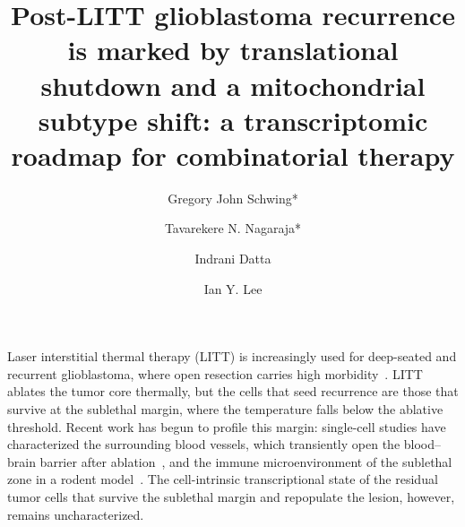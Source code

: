 \documentclass[unnumsec,webpdf,contemporary,large]{oup-authoring-template}
\begin{document}


\title[Post-LITT glioblastoma transcriptomic roadmap]{Post-LITT glioblastoma recurrence is marked by translational shutdown and a mitochondrial subtype shift: a transcriptomic roadmap for combinatorial therapy}

\author[1,$\ast$]{Gregory John Schwing*}
\author[2]{Tavarekere N. Nagaraja*}
\author[2]{Indrani Datta}
\author[2]{Ian Y. Lee}

\address[1]{, , }
\address[2]{, , }


\received{}{}{}
\revised{}{}{}
\accepted{}{}{}

\maketitle


\noindent Laser interstitial thermal therapy (LITT) is increasingly used for deep-seated and recurrent glioblastoma, where open resection carries high morbidity~\cite{LITT_review}. LITT ablates the tumor core thermally, but the cells that seed recurrence are those that survive at the sublethal margin, where the temperature falls below the ablative threshold. Recent work has begun to profile this margin: single-cell studies have characterized the surrounding blood vessels, which transiently open the blood--brain barrier after ablation~\cite{Cleary}, and the immune microenvironment of the sublethal zone in a rodent model~\cite{Tao}. The cell-intrinsic transcriptional state of the residual tumor cells that survive the sublethal margin and repopulate the lesion, however, remains uncharacterized.
\end{document}
